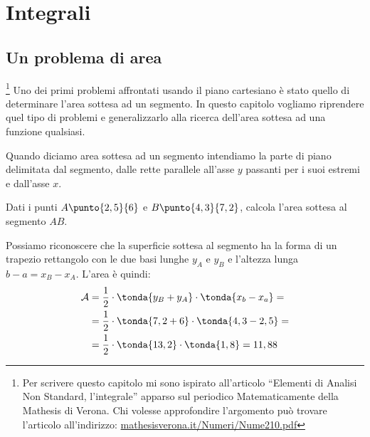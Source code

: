 


% 

\chapter{Integrali} 

\section{Un problema di area}
\label{sec:integrali_area}

\footnote{Per scrivere questo capitolo mi sono ispirato 
all'articolo ``Elementi di Analisi Non Standard, l'integrale'' apparso sul 
periodico Matematicamente della Mathesis di Verona. 
Chi volesse approfondire l'argomento può trovare l'articolo 
all'indirizzo: 
\href{http://mathesisverona.it/Numeri/Nume210.pdf}
     {mathesisverona.it/Numeri/Nume210.pdf}}
Uno dei primi problemi affrontati usando il piano cartesiano è stato quello 
di determinare l'area sottesa ad un segmento. In questo capitolo vogliamo 
riprendere quel tipo di problemi e generalizzarlo alla ricerca dell'area 
sottesa ad una funzione qualsiasi.

Quando diciamo area sottesa ad un segmento intendiamo la parte di piano 
delimitata dal segmento, dalle rette parallele all'asse \(y\) passanti per i 
suoi estremi e dall'asse \(x\).

\begin{esempio}
Dati i punti \(A \punto{2,5}{6}\) e \(B \punto{4,3}{7,2}\), calcola l'area 
sottesa al segmento \(AB\).

\begin{minipage}{.29\textwidth}
\begin{inaccessibleblock}
  \areasottesasegmento
\end{inaccessibleblock}
\end{minipage}
\hfill
\begin{minipage}{.69\textwidth}
 Possiamo riconoscere che la superficie sottesa al segmento ha la forma di un 
trapezio rettangolo con le due basi lunghe \(y_A\) e \(y_B\) e l'altezza 
lunga \(b - a = x_B - x_A\). L'area è quindi:
\begin{align*}
 \mathcal{A} &= \frac{1}{2} \cdot \tonda{y_B + y_A} \cdot \tonda{x_b - x_a}=\\
             &= \frac{1}{2} \cdot \tonda{7,2 + 6} \cdot \tonda{4,3 - 2,5} =\\
             &= \frac{1}{2} \cdot \tonda{13,2} \cdot \tonda{1,8} = 11,88
\end{align*}
\end{minipage}
\end{esempio}

